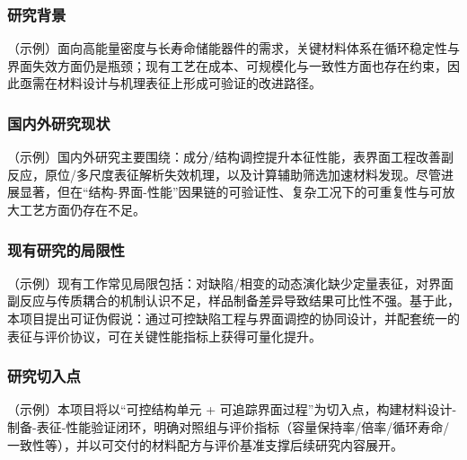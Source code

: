 
\subsubsection{研究背景}
\justifying\indent
（示例）面向高能量密度与长寿命储能器件的需求，关键材料体系在循环稳定性与界面失效方面仍是瓶颈；现有工艺在成本、可规模化与一致性方面也存在约束，因此亟需在材料设计与机理表征上形成可验证的改进路径。

\subsubsection{国内外研究现状}
\indent
（示例）国内外研究主要围绕：成分/结构调控提升本征性能，表界面工程改善副反应，原位/多尺度表征解析失效机理，以及计算辅助筛选加速材料发现。尽管进展显著，但在“结构-界面-性能”因果链的可验证性、复杂工况下的可重复性与可放大工艺方面仍存在不足。

\subsubsection{现有研究的局限性}
\indent
（示例）现有工作常见局限包括：对缺陷/相变的动态演化缺少定量表征，对界面副反应与传质耦合的机制认识不足，样品制备差异导致结果可比性不强。基于此，本项目提出可证伪假说：通过可控缺陷工程与界面调控的协同设计，并配套统一的表征与评价协议，可在关键性能指标上获得可量化提升。

\subsubsection{研究切入点}
\indent
（示例）本项目将以“可控结构单元 + 可追踪界面过程”为切入点，构建材料设计-制备-表征-性能验证闭环，明确对照组与评价指标（容量保持率/倍率/循环寿命/一致性等），并以可交付的材料配方与评价基准支撑后续研究内容展开。

